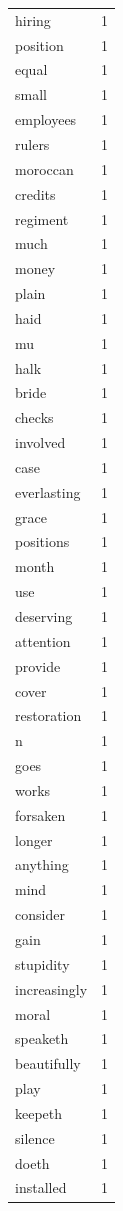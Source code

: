 \begin{tabular}{lr}
hiring & 1 \\
position & 1 \\
equal & 1 \\
small & 1 \\
employees & 1 \\
rulers & 1 \\
moroccan & 1 \\
credits & 1 \\
regiment & 1 \\
much & 1 \\
money & 1 \\
plain & 1 \\
haid & 1 \\
mu & 1 \\
halk & 1 \\
bride & 1 \\
checks & 1 \\
involved & 1 \\
case & 1 \\
everlasting & 1 \\
grace & 1 \\
positions & 1 \\
month & 1 \\
use & 1 \\
deserving & 1 \\
attention & 1 \\
provide & 1 \\
cover & 1 \\
restoration & 1 \\
n & 1 \\
goes & 1 \\
works & 1 \\
forsaken & 1 \\
longer & 1 \\
anything & 1 \\
mind & 1 \\
consider & 1 \\
gain & 1 \\
stupidity & 1 \\
increasingly & 1 \\
moral & 1 \\
speaketh & 1 \\
beautifully & 1 \\
play & 1 \\
keepeth & 1 \\
silence & 1 \\
doeth & 1 \\
installed & 1 \\

\end{tabular}
